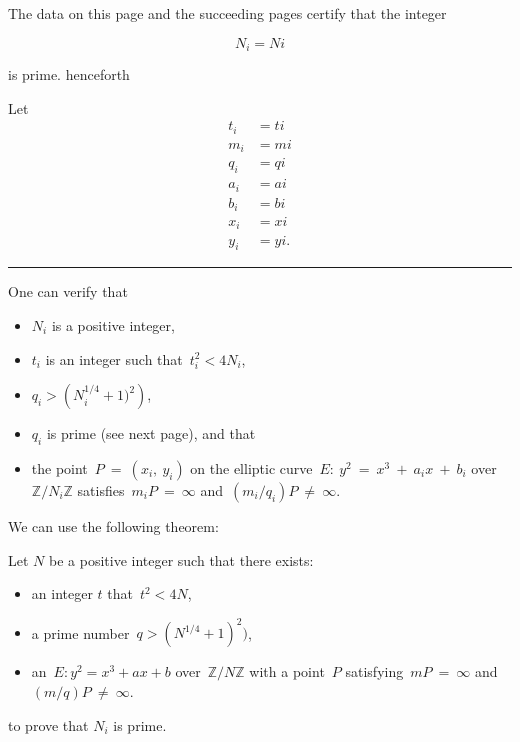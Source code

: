 \pagestyle{empty}
\phantom{a}
\vspace{2em}

\begin{center}
{\Huge {}}
\end{center}
\vspace{2em}

\noindent The data on this page and the succeeding pages certify that the integer

{\tiny
$$
N_{ {{ i }} } = {{ Ni }}
$$
}

\noindent is prime. {{ henceforth }}

\vspace{2em}

\noindent Let
{\tiny
\begin{align*}
t_{ {{ i }} } &= {{ ti }} \\
m_{ {{ i }} } &= {{ mi }} \\
q_{ {{ i }} } &= {{ qi }} \\
a_{ {{ i }} } &= {{ ai }} \\
b_{ {{ i }} } &= {{ bi }} \\
x_{ {{ i }} } &= {{ xi }} \\
y_{ {{ i }} } &= {{ yi }}.
\end{align*}
}

\vspace{0.5em}
\hrule
\vspace{0.5em}

\begin{multicols}{2}
\noindent One can verify that
\begin{itemize}
\item $N_{ {{ i }} }$ is a positive integer,
\item $t_{ {{ i }} }$ is an integer such that~$t_{ {{ i }} }^2 < 4N_{ {{ i }} }$,
\item $q_{ {{ i }} } > \left(N_{ {{ i }} }^{1/4} + 1)^2\right)$,
\item $q_{ {{ i }} }$ is prime (see next page), and that
\item the point~$P~=~(x_{ {{ i }} },~y_{ {{ i }} })$ on the elliptic curve~$E:~y^2~=~x^3~+~a_{ {{ i }} }x~+~b_{ {{ i }} }$ over~$\mathbb{Z}/{N_{ {{ i }} }}\mathbb{Z}$ satisfies~$m_{ {{ i }} }P~=~\infty$ and~$(m_{ {{ i }} }/q_{ {{ i }} })P~\neq~\infty$.
\end{itemize}
\columnbreak
\noindent We can use the following theorem:
\begin{theorem*}
Let $N$ be a positive integer such that there exists:
\begin{itemize}
\item an integer $t$ that~$t^2 < 4N$,
\item a prime number~$q > (N^{1/4} + 1)^2)$,
\item an~$E: y^2 = x^3 + ax + b$ over~$\mathbb{Z}/{N}\mathbb{Z}$ with a point~$P$ satisfying~$mP~=~\infty$ and~$(m/q)P~\neq~\infty$.
\end{itemize}
\end{theorem*}
\noindent to prove that $N_{ {{ i }} }$ is prime.
\end{multicols}

\newpage
